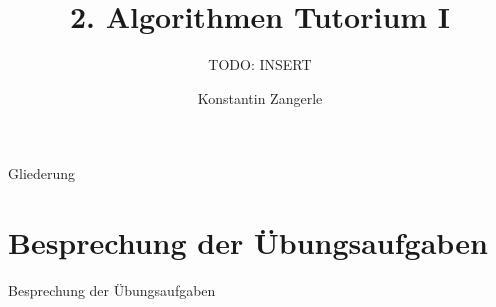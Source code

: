 \documentclass[18pt]{beamer}
\title[Algo I Tut]{2. Algorithmen Tutorium I}
\subtitle{TODO: INSERT}
\author[Zangerle]{Konstantin Zangerle}
\institute{Institut für Theoretische Informatik}
\begin{document}

\begin{frame}
\titlepage
\end{frame}

\begin{frame}{Gliederung}
 \tableofcontents
\end{frame}

\section{Besprechung der Übungsaufgaben}
\begin{frame}{Besprechung der Übungsaufgaben}
\end{frame}
\end{document}
